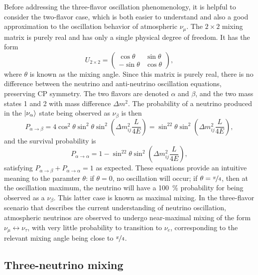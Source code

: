 Before addressing the three-flavor oscillation phenomenology,
it is helpful to consider the two-flavor case,
which is both easier to understand
and also a good approximation to the oscillation behavior
of atmospheric $\nu_\mu$.
The $2\times2$ mixing matrix is purely real
and has only a single physical degree of freedom.
It has the form
\begin{equation}\label{eq:2d_mixing}
    U_{2\times2} =
    \begin{pmatrix}
        \cos\theta & \sin\theta \\
        -\sin\theta & \cos\theta
    \end{pmatrix},
\end{equation}
where $\theta$ is known as the mixing angle.
Since this matrix is purely real,
there is no difference between the neutrino and anti-neutrino
oscillation equations, preserving CP symmetry.
The two flavors are denoted $\alpha$ and $\beta$,
and the two mass states 1 and 2 with mass difference $\Delta m^2$.
The probability of a neutrino produced in the $\ket{\nu_\alpha}$ state
being observed as $\nu_\beta$ is then
\begin{equation}\label{eq:2d_osc}
    P_{\alpha\to\beta} = 4\cos^2\theta\sin^2\theta
    \sin^2\left(\Delta m^2_{ij}\frac{L}{4E}\right)
    = \sin^22\theta \sin^2\left(\Delta m^2_{ij}\frac{L}{4E}\right),
\end{equation}
and the survival probability is
\begin{equation}\label{eq:2d_p_sur}
    P_{\alpha\to\alpha} = 1 -
    \sin^22\theta \sin^2\left(\Delta m^2_{ij}\frac{L}{4E}\right),
\end{equation}
satisfying $P_{\alpha\to\beta} + P_{\alpha\to\alpha} = 1$ as expected.
These equations provide an intuitive meaning to the paramter $\theta$:
if $\theta = 0$, no oscillation will occur;
if $\theta = \nicefrac{\pi}{4}$,
then at the oscillation maximum, the neutrino will have a \SI{100}{\percent}
probability for being observed as a $\nu_\beta$.
This latter case is known as maximal mixing.
In the three-flavor scenario that describes the current understanding
of neutrino oscillation,
atmospheric neutrinos are observed to undergo near-maximal mixing
of the form $\nu_\mu\leftrightarrow\nu_\tau$,
with very little probability to transition to $\nu_e$,
corresponding to the relevant mixing angle being close to $\nicefrac{\pi}{4}$.

\subsection{Three-neutrino mixing}
\label{subsec:three_nu_mixing}

